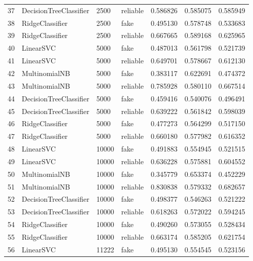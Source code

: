 \begin{longtable}{llllrrr}
37 &  DecisionTreeClassifier &         2500 &  reliable &  0.586826 &   0.585075 &  0.585949 \\
38 &         RidgeClassifier &         2500 &      fake &  0.495130 &   0.578748 &  0.533683 \\
39 &         RidgeClassifier &         2500 &  reliable &  0.667665 &   0.589168 &  0.625965 \\
40 &               LinearSVC &         5000 &      fake &  0.487013 &   0.561798 &  0.521739 \\
41 &               LinearSVC &         5000 &  reliable &  0.649701 &   0.578667 &  0.612130 \\
42 &           MultinomialNB &         5000 &      fake &  0.383117 &   0.622691 &  0.474372 \\
43 &           MultinomialNB &         5000 &  reliable &  0.785928 &   0.580110 &  0.667514 \\
44 &  DecisionTreeClassifier &         5000 &      fake &  0.459416 &   0.540076 &  0.496491 \\
45 &  DecisionTreeClassifier &         5000 &  reliable &  0.639222 &   0.561842 &  0.598039 \\
46 &         RidgeClassifier &         5000 &      fake &  0.477273 &   0.564299 &  0.517150 \\
47 &         RidgeClassifier &         5000 &  reliable &  0.660180 &   0.577982 &  0.616352 \\
48 &               LinearSVC &        10000 &      fake &  0.491883 &   0.554945 &  0.521515 \\
49 &               LinearSVC &        10000 &  reliable &  0.636228 &   0.575881 &  0.604552 \\
50 &           MultinomialNB &        10000 &      fake &  0.345779 &   0.653374 &  0.452229 \\
51 &           MultinomialNB &        10000 &  reliable &  0.830838 &   0.579332 &  0.682657 \\
52 &  DecisionTreeClassifier &        10000 &      fake &  0.498377 &   0.546263 &  0.521222 \\
53 &  DecisionTreeClassifier &        10000 &  reliable &  0.618263 &   0.572022 &  0.594245 \\
54 &         RidgeClassifier &        10000 &      fake &  0.490260 &   0.573055 &  0.528434 \\
55 &         RidgeClassifier &        10000 &  reliable &  0.663174 &   0.585205 &  0.621754 \\
56 &               LinearSVC &        11222 &      fake &  0.495130 &   0.554545 &  0.523156 \\

\end{longtable}
